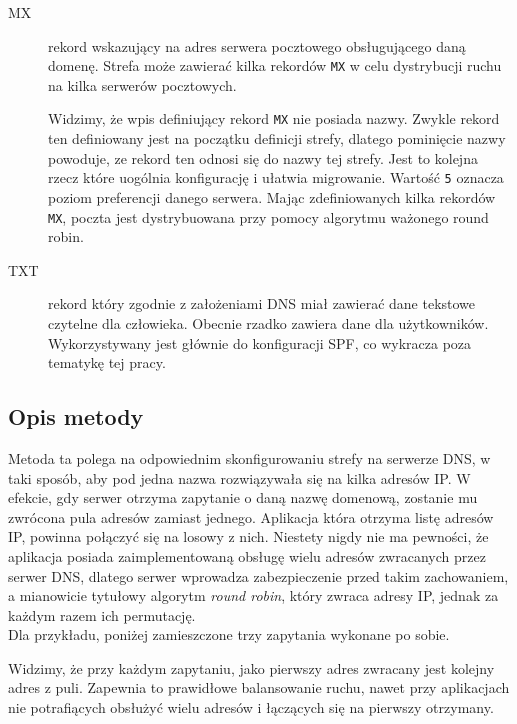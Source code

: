 {\begin{description}
\item[MX] rekord wskazujący na adres serwera pocztowego obsługującego daną domenę.
Strefa może zawierać kilka rekordów \texttt{MX} w celu dystrybucji ruchu na kilka serwerów pocztowych.

Widzimy, że wpis definiujący rekord \texttt{MX} nie posiada nazwy. Zwykle rekord ten definiowany jest na początku definicji strefy, dlatego pominięcie nazwy powoduje, ze rekord ten odnosi się do nazwy tej strefy.
Jest to kolejna rzecz które uogólnia konfigurację i ułatwia migrowanie.
Wartość \texttt{5} oznacza poziom preferencji danego serwera. Mając zdefiniowanych kilka rekordów \texttt{MX}, poczta jest dystrybuowana przy pomocy algorytmu ważonego round robin.
\item[TXT] rekord który zgodnie z założeniami DNS miał zawierać dane tekstowe czytelne dla człowieka.
Obecnie rzadko zawiera dane dla użytkowników. Wykorzystywany jest głównie do konfiguracji SPF, co wykracza poza tematykę tej pracy.
\end{description}
\subsection{Opis metody}
Metoda ta polega na odpowiednim skonfigurowaniu strefy na serwerze DNS, w taki sposób, aby pod jedna nazwa rozwiązywała się na kilka adresów IP.
W efekcie, gdy serwer otrzyma zapytanie o daną nazwę domenową, zostanie mu zwrócona pula adresów zamiast jednego.
Aplikacja która otrzyma listę adresów IP, powinna połączyć się na losowy z nich.
Niestety nigdy nie ma pewności, że aplikacja posiada zaimplementowaną obsługę wielu adresów zwracanych przez serwer DNS, dlatego serwer wprowadza zabezpieczenie przed takim zachowaniem, a mianowicie tytułowy algorytm \textit{round robin}, który zwraca adresy IP, jednak za każdym razem ich permutację.\\
Dla przykładu, poniżej zamieszczone trzy zapytania wykonane po sobie.

Widzimy, że przy każdym zapytaniu, jako pierwszy adres zwracany jest kolejny adres z puli. Zapewnia to prawidłowe balansowanie ruchu, nawet przy aplikacjach nie potrafiących obsłużyć wielu adresów i łączących się na pierwszy otrzymany.

}
